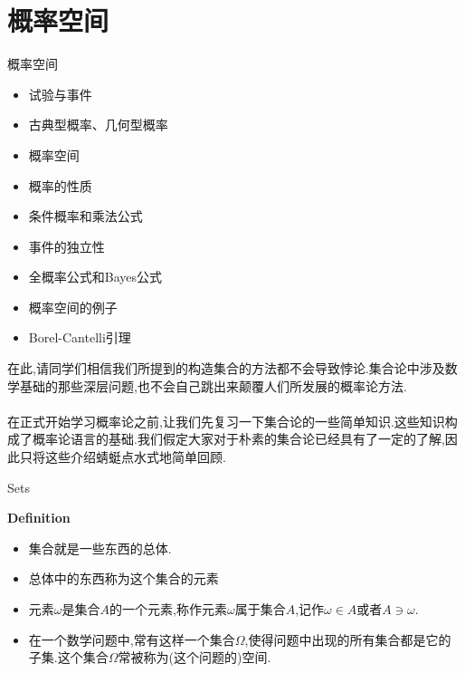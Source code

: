 \section{概率空间}
    
    \frame{\sectionpage}
    
    \begin{frame}{概率空间}
        \begin{itemize}
        	\item 试验与事件
        	\item 古典型概率、几何型概率
        	\item 概率空间
        	\item 概率的性质
        	\item 条件概率和乘法公式
        	\item 事件的独立性
        	\item 全概率公式和Bayes公式
        	\item 概率空间的例子
        	\item Borel-Cantelli引理
        \end{itemize}
    \end{frame}
    

	\begin{frame}
		\Large\alert{
			在此,请同学们相信我们所提到的构造集合的方法都不会导致悖论.集合论中涉及数学基础的那些深层问题,也不会自己跳出来颠覆人们所发展的概率论方法.
		}
		\\ \hspace*{\fill} \\%
		在正式开始学习概率论之前,让我们先复习一下集合论的一些简单知识.这些知识构成了概率论语言的基础.我们假定大家对于朴素的集合论已经具有了一定的了解,因此只将这些介绍蜻蜓点水式地简单回顾.
	\end{frame}

	\begin{frame}{Sets}
		\begin{block}{\textbf{Definition}}
			\begin{itemize}
				\item \alert{集合}就是一些东西的总体.
				\item 总体中的东西称为这个集合的\alert{元素}
				\item 元素$\omega$是集合$A$的一个元素,称作元素$\omega$属于集合$A$,记作$\omega\in A$或者$A\ni\omega$.
				\item 在一个数学问题中,常有这样一个集合$\Omega$,使得问题中出现的所有集合都是它的子集.这个集合$\Omega$常被称为(这个问题的)\alert{空间}.
			\end{itemize}	
		\end{block}
	\end{frame}








